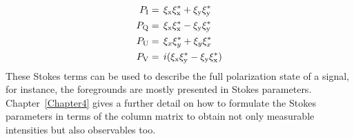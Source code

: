 \begin{subequations}
\begin{align}
P_{\rm I}  & =\,  \xi_{\rm x}\xi_{\rm x}^{*} + \xi_{\rm y}\xi_{\rm y}^{*}	 	\label{eq:q20a} \\
P_{\rm Q}  & =\,  \xi_{\rm x}\xi_{\rm x}^{*} - \xi_{\rm y}\xi_{\rm y}^{*}		\label{eq:q20b} \\
P_{\rm U}  & =\, \xi_{x}\xi_{y}^{*} + \xi_{y}\xi_{x}^{*} 		\label{eq:q20c} \\ 
P_{\rm V}  & =\,  i(\xi_{\rm x}\xi_{\rm y}^{*} - \xi_{\rm y}\xi_{\rm x}^{*})		\label{eq:q20d} 
\end{align}
\label{eq:q20}
\end{subequations}
% 
These Stokes terms can be used to describe the full polarization state of a signal, for instance, the foregrounds are mostly presented in Stokes parameters.
Chapter~\ref{Chapter4} gives a further detail on how to formulate the Stokes parameters in 
terms of the column matrix to obtain not only measurable intensities but also observables too.
% 
% 

